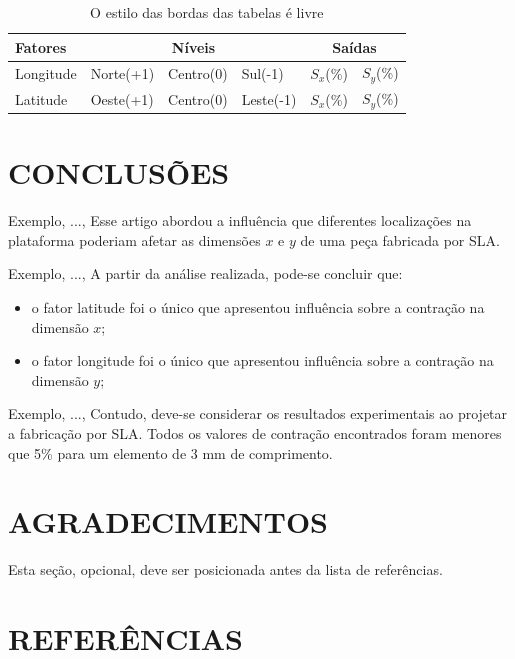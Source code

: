 \documentclass[10pt,fleqn,a4paper,twoside]{article}
\begin{document}
\begin{table}[htbp]
  \centering
  \caption{O estilo das bordas das tabelas é livre}
    \begin{tabular}{llllcc}
	\\
 \toprule
    \textbf{Fatores} & \multicolumn{3}{c}{\textbf{Níveis}} & \multicolumn{2}{c}{\textbf{Saídas}} \\
\midrule
    Longitude & Norte(+1) & Centro(0) & Sul(-1) & $S_x$(\%) & $S_y$(\%) \\
    Latitude & Oeste(+1) & Centro(0) & Leste(-1) & $S_x$(\%) & $S_y$(\%) \\
  \bottomrule
    \end{tabular}%
  \label{Tab1}%
\end{table}%





\section{CONCLUSÕES}

Exemplo, ..., Esse artigo abordou a influência que diferentes localizações na plataforma poderiam afetar as dimensões $x$ e $y$ de uma peça fabricada por SLA. 

Exemplo, ..., A partir da análise realizada, pode-se concluir que: 
\begin{itemize}
\item o fator latitude foi o único que apresentou influência sobre a contração na dimensão $x$;
\item o fator longitude foi o único que apresentou influência sobre a contração na dimensão $y$;

\end{itemize}

Exemplo, ..., Contudo, deve-se considerar os resultados experimentais ao projetar a fabricação por SLA. Todos os valores de contração encontrados foram menores que 5\% para um elemento de 3 mm de comprimento. 

\section{AGRADECIMENTOS}

Esta seção, opcional, deve ser posicionada antes da lista de referências.

\nocite{ABCM}
\nocite{phdthesis}
\section{REFERÊNCIAS}


\end{document}
